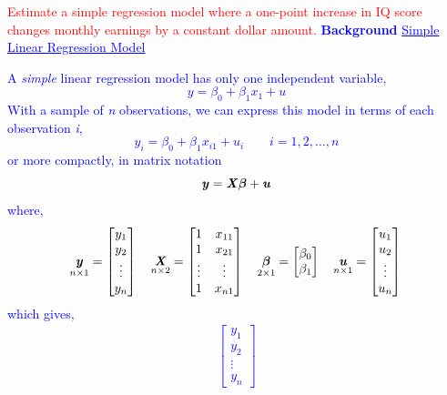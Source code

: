 \documentclass[12pt]{report}
\newenvironment{blueframed}[1][blue]
{\def\FrameCommand{\fboxsep=\FrameSep\fcolorbox{#1}{white}}%
\MakeFramed {\advance\hsize-\width \FrameRestore}}
{\endMakeFramed}
\begin{document}
\noindent \textcolor{red}{Estimate a simple regression model where a one-point increase in IQ score changes monthly earnings by a constant dollar amount.}
\justify
\begin{blueframed}
	\textcolor{blue}{\textbf{Background}}	
	\vspace{-\baselineskip}
	\justify
	\textcolor{blue}{\underline{Simple Linear Regression Model}}
	
	\noindent \textcolor{blue}{A \textit{simple} linear regression model has only one independent variable, $$y = \beta_0+\beta_1x_{1}+u$$ With a sample of \textit{n} observations, we can express this model in terms of each observation \textit{i},
	}
\end{blueframed}
\begin{blueframed}
	\noindent \textcolor{blue}
	{$$y_i = \beta_0+\beta_1x_{i1}+u_i \qquad i=1,2,\dots,n$$ or more compactly, in matrix notation
	$$\textbf{\textit{y}}=\textbf{\textit{X}}\boldsymbol{\beta}+\textbf{\textit{u}}$$
	where,
	$$
	\underset{n\times1}{\textbf{\textit{y}}}
	=
	\begin{bmatrix}
	y_{1} \\
	y_{2} \\
	\vdots \\
	y_{n} 
	\end{bmatrix}
	\quad
	\underset{n\times2}{\textbf{\textit{X}}}
	=
	\begin{bmatrix}
	1 & x_{11} \\
	1 & x_{21} \\
	\vdots & \vdots \\
	1 & x_{n1}  
	\end{bmatrix}
	\quad
	\underset{2\times1}{\boldsymbol{\beta}} =
	\begin{bmatrix}
	\beta_0 \\
	\beta_1 
	\end{bmatrix} 
	\quad
	\underset{n\times1}{\textbf{\textit{u}}}
	=
	\begin{bmatrix}
	u_{1} \\
	u_{2} \\
	\vdots \\
	u_{n} 
	\end{bmatrix} \\
	$$
	which gives,
	\begin{align*}
	\begin{bmatrix}
		y_{1} \\
		y_{2} \\
		\vdots \\
		y_{n} 
	\end{bmatrix}

\end{align*}}
\end{blueframed}
\end{document}
